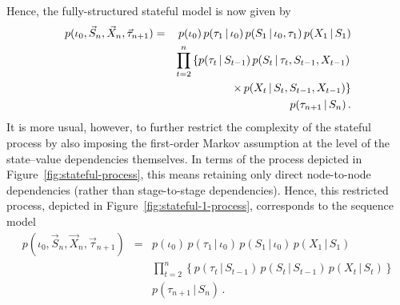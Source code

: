 \documentclass[a4paper]{article}
\begin{document}
Hence, the fully-structured stateful model is now given by
\begin{eqnarray}
p(\iota_0,\vec{S}_n,\vec{X}_n,\vec{\tau}_{n+1}) & = & 
p(\iota_0)\,p(\tau_1\,|\,\iota_0)\,p(S_1\,|\,\iota_0,\tau_1)\,p(X_1\,|\,S_1)
\nonumber\\&&
\prod_{t=2}^{n}\left\{p(\tau_t\,|\,S_{t-1})\,p(S_t\,|\,\tau_t,S_{t-1},X_{t-1})\right.
\nonumber\\&&
\left.\hspace*{10mm}\times\, p(X_t\,|\,S_t,S_{t-1},X_{t-1})\right\}
\nonumber\\&&
p(\tau_{n+1}\,|\,S_n)
\,.
\end{eqnarray}
It is more usual, however, to further restrict the complexity of the stateful process
by also imposing the first-order Markov assumption at the level
of the state--value dependencies themselves. In terms of the process depicted in Figure~\ref{fig:stateful-process},
this means retaining only direct node-to-node dependencies (rather than stage-to-stage dependencies).
Hence, this restricted process, depicted in Figure~\ref{fig:stateful-1-process},
corresponds to the sequence model
\begin{eqnarray}
p(\iota_0,\vec{S}_n,\vec{X}_n,\vec{\tau}_{n+1}) & = & 
p(\iota_0)\,p(\tau_1\,|\,\iota_0)\,p(S_1\,|\,\iota_0)\,p(X_1\,|\,S_1)
\nonumber\\&&
\prod_{t=2}^{n}\left\{p(\tau_t\,|\,S_{t-1})\,p(S_t\,|\,S_{t-1})\,p(X_t\,|\,S_t)\right\}
\nonumber\\&&
p(\tau_{n+1}\,|\,S_n)
\,.
\end{eqnarray}
\end{document}
